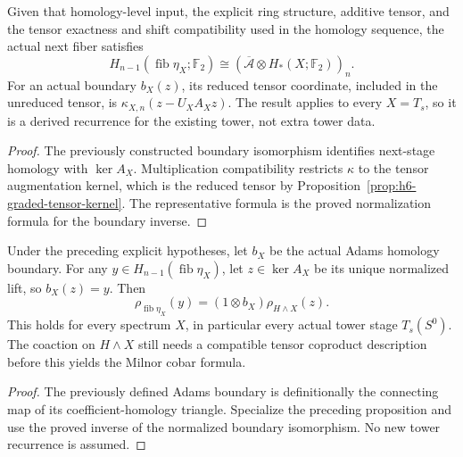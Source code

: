 \begin{proposition}
  \label{prop:h6-kunneth-tower-recurrence}
  \leanok
  Given that homology-level input, the explicit ring structure, additive
  tensor, and the tensor exactness and shift compatibility used in the
  homology sequence, the actual next fiber satisfies
  \[
    H_{n-1}(\operatorname{fib}\eta_X;\mathbb F_2)
      \cong(\overline{\mathcal A}\otimes H_*(X;\mathbb F_2))_n.
  \]
  For an actual boundary $b_X(z)$, its reduced tensor coordinate, included
  in the unreduced tensor, is $\kappa_{X,n}(z-U_XA_Xz)$.
  The result applies to every $X=T_s$, so it is a derived recurrence for
  the existing tower, not extra tower data.
\end{proposition}
\begin{proof}
  The previously constructed boundary isomorphism identifies next-stage
  homology with $\ker A_X$. Multiplication compatibility restricts
  $\kappa$ to the tensor augmentation kernel, which is the reduced tensor
  by Proposition~\ref{prop:h6-graded-tensor-kernel}. The representative
  formula is the proved normalization formula for the boundary inverse.
  \leanok
\end{proof}

\begin{proposition}
  \label{prop:h6-next-stage-coaction}
  \leanok
  Under the preceding explicit hypotheses, let $b_X$ be the actual Adams
  homology boundary. For any $y\in H_{n-1}(\operatorname{fib}\eta_X)$,
  let $z\in\ker A_X$ be its unique normalized lift, so $b_X(z)=y$.
  Then
  \[
    \rho_{\operatorname{fib}\eta_X}(y)
       =(1\otimes b_X)\rho_{H\wedge X}(z).
  \]
  This holds for every spectrum $X$, in particular every actual tower
  stage $T_s(S^0)$. The coaction on $H\wedge X$ still needs a compatible
  tensor coproduct description before this yields the Milnor cobar formula.
\end{proposition}
\begin{proof}
  The previously defined Adams boundary is definitionally the connecting
  map of its coefficient-homology triangle. Specialize the preceding
  proposition and use the proved inverse of the normalized boundary
  isomorphism. No new tower recurrence is assumed.
  \leanok
\end{proof}

